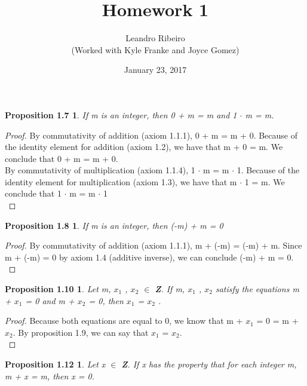 \documentclass[12pt]{amsart}
\begin{document}
\title{Homework 1}
\date{January 23, 2017}
\author{Leandro Ribeiro\\(Worked with Kyle Franke and Joyce Gomez)}

\maketitle

\theoremstyle{plain}
\newtheorem*{prop1.7}{Proposition 1.7}
\begin{prop1.7}
	If m is an integer, then 0 + m = m and 1 $\cdot$ m = m.
\end{prop1.7}

\begin{proof}
	By commutativity of addition (axiom 1.1.1), 0 + m = m + 0. Because of the identity element for addition (axiom 1.2), we have that m + 0 = m. We conclude that 0 + m = m + 0.
	\\ 
	\indent By commutativity of multiplication (axiom 1.1.4), 1 $\cdot$ m = m $\cdot$ 1. Because of the identity element for multiplication (axiom 1.3), we have that m $\cdot$ 1 = m. We conclude that 1 $\cdot$ m = m $\cdot$ 1
	\\
\end{proof}
\newtheorem*{prop1.8}{Proposition 1.8}
\begin{prop1.8}
	If m is an integer, then (-m) + m = 0
\end{prop1.8}

\begin{proof}
	By commutativity of addition (axiom 1.1.1), m + (-m) = (-m) + m. Since m + (-m) = 0 by axiom 1.4 (additive inverse), we can conclude (-m) + m = 0.
	\\
\end{proof}

\newtheorem*{prop1.10}{Proposition 1.10}
\begin{prop1.10}
	Let m, $x_{1}$ , $x_{2}$ $\in$ \textbf{Z}. If m, $x_{1}$ , $x_{2}$ satisfy the equations m + $x_{1}$ = 0 and	m + $x_{2}$ = 0, then $x_{1}$ = $x_{2}$ .
\end{prop1.10}

\begin{proof}
	Because both equations are equal to 0, we know that m + $x_{1}$ = 0 = m + $x_{2}$. By proposition 1.9, we can say that $x_{1}$ = $x_{2}$.
	\\
\end{proof}

\newtheorem*{prop1.12}{Proposition 1.12}
\begin{prop1.12}
	Let x $\in$ \textbf{Z}. If x has the property that for each integer m, m + x = m,
then x = 0.
\end{prop1.12}
\end{document}

